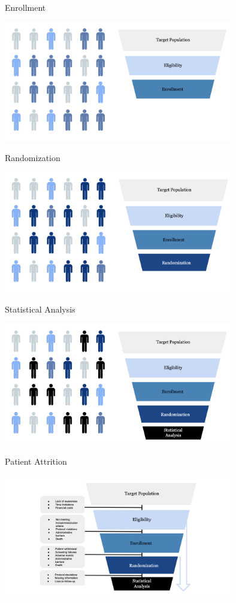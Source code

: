 \documentclass[english]{beamer}\usepackage[]{graphicx}\usepackage[]{xcolor}
\begin{document}
\begin{frame}{Enrollment}

\includegraphics[width=100mm,scale=1]{enrollment.png}


\end{frame}

\begin{frame}{Randomization}

\includegraphics[width=100mm,scale=1]{randomization.png}

\end{frame}

\begin{frame}{Statistical Analysis}

\includegraphics[width=100mm,scale=1]{statanal.png}

\end{frame}


\begin{frame}{Patient Attrition}

\includegraphics[width=100mm,scale=1]{attrition.png}

\end{frame}
\end{document}
